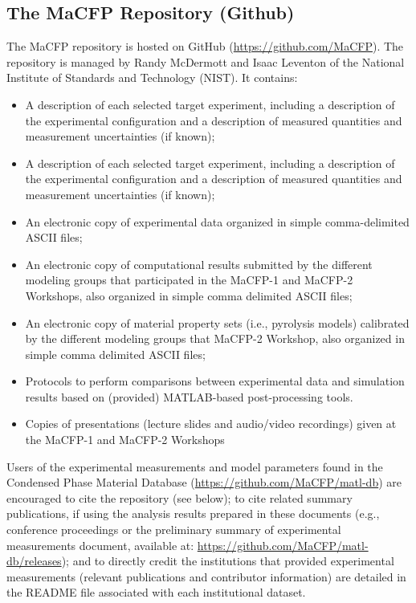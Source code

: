 \documentclass[12pt,demo]{article}
\begin{document}
\subsection{The MaCFP Repository (Github)}
The MaCFP repository is hosted on GitHub (\url{https://github.com/MaCFP}). The repository is managed by Randy McDermott and Isaac Leventon of the National Institute of Standards and Technology (NIST). It contains: 
\begin{itemize}[noitemsep]
 \item A description of each selected target experiment, including a description of the experimental configuration and a description of measured quantities and measurement uncertainties (if known); 
  \item A description of each selected target experiment, including a description of the experimental configuration and a description of measured quantities and measurement uncertainties (if known);  
 \item An electronic copy of experimental data organized in simple comma-delimited ASCII files; 
 \item An electronic copy of computational results submitted by the different modeling groups that participated in the MaCFP-1 and MaCFP-2 Workshops, also organized in simple comma delimited ASCII files; 
  \item An electronic copy of material property sets (i.e., pyrolysis models) calibrated by the different modeling groups that MaCFP-2 Workshop, also organized in simple comma delimited ASCII files; 
 \item Protocols to perform comparisons between experimental data and simulation results based on (provided) MATLAB-based post-processing tools. 
 \item Copies of presentations (lecture slides and audio/video recordings) given at the MaCFP-1 and MaCFP-2 Workshops
\end{itemize}

Users of the experimental measurements and model parameters found in the Condensed Phase Material Database (\url{https://github.com/MaCFP/matl-db}) are encouraged to cite the repository (see below); to cite related summary publications, if using the analysis results prepared in these documents (e.g., conference proceedings \cite{brown2018proceedings} or the preliminary summary of experimental measurements document, available at: \url{https://github.com/MaCFP/matl-db/releases}); and to directly credit the institutions that provided experimental measurements (relevant publications and contributor information) are detailed in the README file associated with each institutional dataset. 
\end{document}

